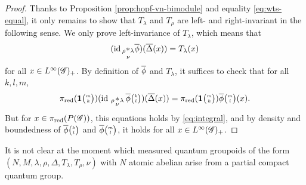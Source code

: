 \begin{proof}
  Thanks to Proposition \ref{prop:hopf-vn-bimodule} and equality  \eqref{eq:wts-equal}, it only remains to show that $T_{\lambda}$ and  $T_{\rho}$ are left- and right-invariant in the following sense. We only prove left-invariance of  $T_{\lambda}$, which  means that
  \begin{align*}
   (\operatorname{id} \underset{\nu}{_{\rho}\ast_{\lambda}} \overline{\phi})(\overline{\Delta}(x)) = T_{\lambda}(x)
  \end{align*}
  for all $x\in L^{\infty}(\mathscr{G})_{+}$. By definition of $\overline{\phi}$ and $T_{\lambda}$, it suffices to check that for all $k,l,m$,
  \begin{align*}
 \pi_{\operatorname{\mathrm{red}}}(\mathbf{1}{\tiny {\begin{pmatrix} m\\k\end{pmatrix}}})    (\operatorname{id} \,{}_{\rho}\!\underset{\nu}{\ast}\,\!\!_{\lambda}\, \overline{\phi}{\tiny {\begin{pmatrix} k\\l\end{pmatrix}}})(\overline{\Delta}(x)) = \pi_{\operatorname{\mathrm{red}}}(\mathbf{1}{\tiny {\begin{pmatrix} m\\k\end{pmatrix}}})\overline{\phi}{\tiny {\begin{pmatrix} m\\l\end{pmatrix}}}(x).
  \end{align*}
But  for $x\in \pi_{\operatorname{\mathrm{red}}}(P(\mathscr{G}))$,  this equations holds by \eqref{eq:integral}, and by density and boundedness of  $\overline{\phi}{\tiny {\begin{pmatrix} k\\l\end{pmatrix}}}$ and $\overline{\phi}{\tiny {\begin{pmatrix} m\\l\end{pmatrix}}}$, it holds for all $x\in L^{\infty}(\mathscr{G})_{+}$. 
\end{proof}

\begin{Rem} It is not clear at the moment which measured quantum groupoids of the form 
$(N,M, \lambda,\rho,\Delta,  T_{\lambda},T_{\rho},\nu)$  with $N$ atomic abelian arise from a partial compact quantum group. 
  \end{Rem}
   
